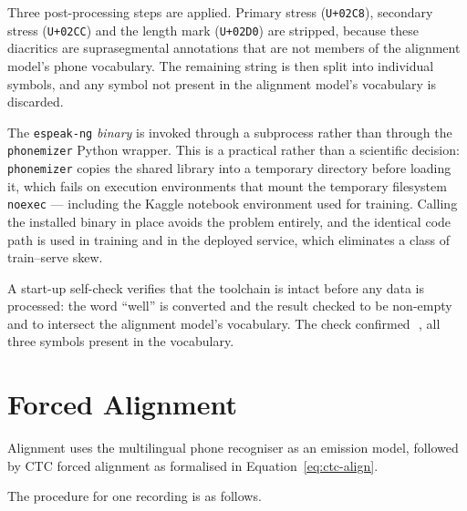 Three post-processing steps are applied. Primary stress (\texttt{U+02C8}),
secondary stress (\texttt{U+02CC}) and the length mark (\texttt{U+02D0}) are
stripped, because these diacritics are suprasegmental annotations that are not
members of the alignment model's phone vocabulary. The remaining string is then
split into individual symbols, and any symbol not present in the alignment
model's vocabulary is discarded.

The \texttt{espeak-ng} \emph{binary} is invoked through a subprocess rather than
through the \texttt{phonemizer} Python wrapper. This is a practical rather than
a scientific decision: \texttt{phonemizer} copies the shared library into a
temporary directory before loading it, which fails on execution environments
that mount the temporary filesystem \texttt{noexec} --- including the Kaggle
notebook environment used for training. Calling the installed binary in place
avoids the problem entirely, and the identical code path is used in training and
in the deployed service, which eliminates a class of train--serve skew.

A start-up self-check verifies that the toolchain is intact before any data is
processed: the word ``well'' is converted and the result checked to be non-empty
and to intersect the alignment model's vocabulary. The check confirmed
\,\,, all three symbols present in the vocabulary.

\section{Forced Alignment}
\label{sec:alignment}

Alignment uses the multilingual phone recogniser
 \cite{xu2022simple} as an emission
model, followed by CTC forced alignment as formalised in
Equation~\eqref{eq:ctc-align}.

The procedure for one recording is as follows.

